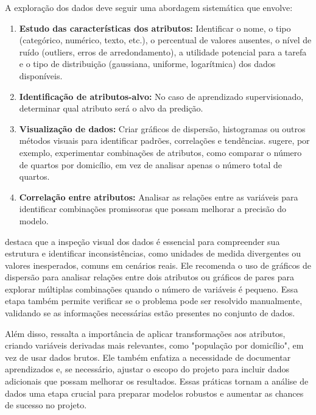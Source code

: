 A exploração dos dados deve seguir uma abordagem sistemática que envolve:

\begin{enumerate}
    \item \textbf{Estudo das características dos atributos:} Identificar o nome, o tipo (categórico, numérico, texto, etc.), o percentual de valores ausentes, o nível de ruído (outliers, erros de arredondamento), a utilidade potencial para a tarefa e o tipo de distribuição (gaussiana, uniforme, logarítmica) dos dados disponíveis.
    \item \textbf{Identificação de atributos-alvo:} No caso de aprendizado supervisionado, determinar qual atributo será o alvo da predição.
    \item \textbf{Visualização de dados:} Criar gráficos de dispersão, histogramas ou outros métodos visuais para identificar padrões, correlações e tendências.  sugere, por exemplo, experimentar combinações de atributos, como comparar o número de quartos por domicílio, em vez de analisar apenas o número total de quartos.
    \item \textbf{Correlação entre atributos:} Analisar as relações entre as variáveis para identificar combinações promissoras que possam melhorar a precisão do modelo.
\end{enumerate}

 destaca que a inspeção visual dos dados é essencial para compreender sua estrutura e identificar inconsistências, como unidades de medida divergentes ou valores inesperados, comuns em cenários reais. Ele recomenda o uso de gráficos de dispersão para analisar relações entre dois atributos ou gráficos de pares para explorar múltiplas combinações quando o número de variáveis é pequeno. Essa etapa também permite verificar se o problema pode ser resolvido manualmente, validando se as informações necessárias estão presentes no conjunto de dados.

Além disso,  ressalta a importância de aplicar transformações aos atributos, criando variáveis derivadas mais relevantes, como "população por domicílio", em vez de usar dados brutos. Ele também enfatiza a necessidade de documentar aprendizados e, se necessário, ajustar o escopo do projeto para incluir dados adicionais que possam melhorar os resultados. Essas práticas tornam a análise de dados uma etapa crucial para preparar modelos robustos e aumentar as chances de sucesso no projeto.

